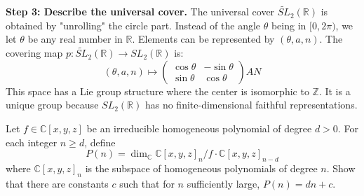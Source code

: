 \begin{solution}
\textbf{Step 3: Describe the universal cover.}
The universal cover $\widetilde{SL}_2(\mathbb{R})$ is obtained by "unrolling" the circle part. Instead of the angle $\theta$ being in $[0, 2\pi)$, we let $\theta$ be any real number in $\mathbb{R}$.
Elements can be represented by $(\theta, a, n)$.
The covering map $p: \widetilde{SL}_2(\mathbb{R}) \to SL_2(\mathbb{R})$ is:
\[ (\theta, a, n) \mapsto \begin{pmatrix} \cos \theta & -\sin \theta \\ \sin \theta & \cos \theta \end{pmatrix} A N \]
This space has a Lie group structure where the center is isomorphic to $\mathbb{Z}$. It is a unique group because $SL_2(\mathbb{R})$ has no finite-dimensional faithful representations.
\end{solution}

\begin{exercise}
\label{algebra:2012:11}
Let $f \in \mathbb{C}[x, y, z]$ be an irreducible homogeneous polynomial of degree $d > 0$. For each integer $n \geq d$, define
\[ P(n) = \dim_{\mathbb{C}} \mathbb{C}[x, y, z]_n / f \cdot \mathbb{C}[x, y, z]_{n-d} \]
where $\mathbb{C}[x, y, z]_n$ is the subspace of homogeneous polynomials of degree $n$. Show that there are constants $c$ such that for $n$ sufficiently large, $P(n) = dn + c$.
\end{exercise}

